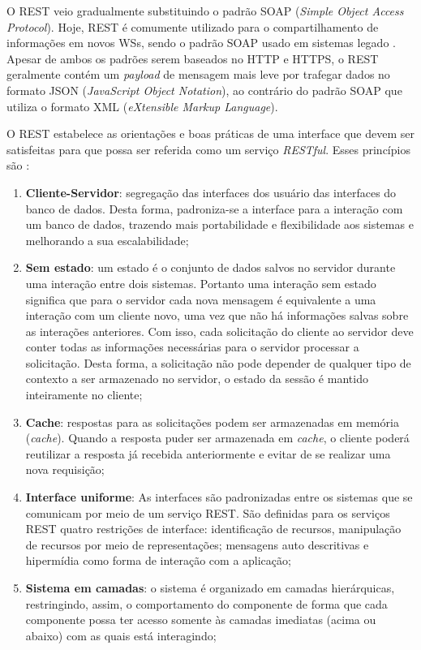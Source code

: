 O REST veio gradualmente substituindo o padrão SOAP (\textit{Simple Object Access Protocol}). Hoje, REST é comumente utilizado para o compartilhamento de informações em novos WSs, sendo o padrão SOAP usado em sistemas legado \cite{serrano2014soaplegacy}. Apesar de ambos os padrões serem baseados no HTTP e HTTPS, o REST geralmente contém um \textit{payload} de mensagem mais leve por trafegar dados no formato JSON (\textit{JavaScript Object Notation}), ao contrário do padrão SOAP que utiliza o formato XML (\textit{eXtensible Markup Language}).

O REST estabelece as orientações e boas práticas de uma interface que devem ser satisfeitas para que possa ser referida como um serviço \textit{RESTful}. Esses princípios são \cite{fielding2000rest}:

\begin{enumerate}
	\item \textbf{Cliente-Servidor}: segregação das interfaces dos usuário das interfaces do banco de dados. Desta forma, padroniza-se a interface para a interação com um banco de dados, trazendo mais portabilidade e flexibilidade aos sistemas e melhorando a sua escalabilidade;

	\item \textbf{Sem estado}: um estado é o conjunto de dados salvos no servidor durante uma interação entre dois sistemas. Portanto uma interação sem estado significa que para o servidor cada nova mensagem é equivalente a uma interação com um cliente novo, uma vez que não há informações salvas sobre as interações anteriores. Com isso, cada solicitação do cliente ao servidor deve conter todas as informações necessárias para o servidor processar a solicitação. Desta forma, a solicitação não pode depender de qualquer tipo de contexto a ser armazenado no servidor, o estado da sessão é mantido inteiramente no cliente;

	\item \textbf{Cache}: respostas para as solicitações podem ser armazenadas em memória (\textit{cache}). Quando a resposta puder ser armazenada em \textit{cache}, o cliente poderá reutilizar a resposta já recebida anteriormente e evitar de se realizar uma nova requisição;

	\item \textbf{Interface uniforme}: As interfaces são padronizadas entre os sistemas que se comunicam por meio de um serviço REST. São definidas para os serviços REST quatro restrições de interface: identificação de recursos, manipulação de recursos por meio de representações; mensagens auto descritivas e hipermídia como forma de interação com a aplicação;

	\item \textbf{Sistema em camadas}: o sistema é organizado em camadas hierárquicas, restringindo, assim, o comportamento do componente de forma que cada componente possa ter acesso somente às camadas imediatas (acima ou abaixo) com as quais está interagindo;
\end{enumerate}

